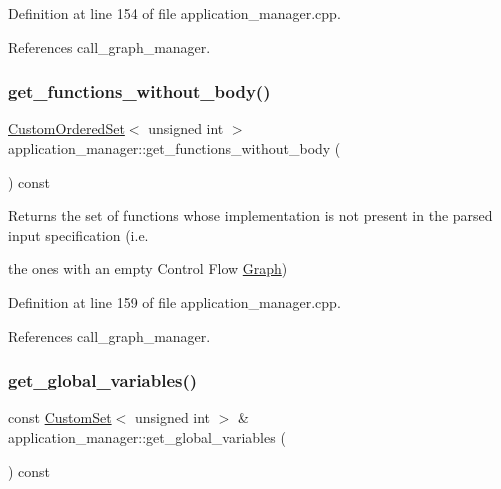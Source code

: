 Definition at line 154 of file application\+\_\+manager.\+cpp.



References call\+\_\+graph\+\_\+manager.

\mbox{\label{classapplication__manager_af0f7db45a6ef1caffdffc644a03d8246}} 
\subsubsection{\texorpdfstring{get\+\_\+functions\+\_\+without\+\_\+body()}{get\_functions\_without\_body()}}
{\footnotesize\ttfamily \hyperlink{classCustomOrderedSet}{Custom\+Ordered\+Set}$<$ unsigned int $>$ application\+\_\+manager\+::get\+\_\+functions\+\_\+without\+\_\+body (\begin{DoxyParamCaption}{ }\end{DoxyParamCaption}) const}



Returns the set of functions whose implementation is not present in the parsed input specification (i.\+e. 

the ones with an empty Control Flow \hyperlink{structGraph}{Graph}) 

Definition at line 159 of file application\+\_\+manager.\+cpp.



References call\+\_\+graph\+\_\+manager.

\mbox{\label{classapplication__manager_a68b9ede8165189c2030c568815b66309}} 
\subsubsection{\texorpdfstring{get\+\_\+global\+\_\+variables()}{get\_global\_variables()}}
{\footnotesize\ttfamily const \hyperlink{custom__set_8hpp_a615bc2f42fc38a4bb1790d12c759e86f}{Custom\+Set}$<$ unsigned int $>$ \& application\+\_\+manager\+::get\+\_\+global\+\_\+variables (\begin{DoxyParamCaption}{ }\end{DoxyParamCaption}) const}



